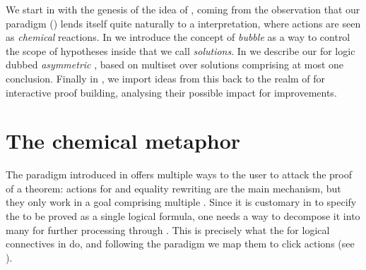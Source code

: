 \begin{scope}
We start in  with the genesis of the idea of , coming from the observation that our  paradigm
() lends itself quite naturally to a 
interpretation, where actions are seen as \emph{chemical} reactions. In
 we introduce the concept of \emph{bubble} as a way to control
the scope of hypotheses inside  that we call
\emph{solutions}. In  we describe our  for
 logic dubbed \emph{asymmetric }, based
on multiset  over solutions comprising at most one
conclusion. Finally in , we import ideas from this
 back to the realm of  for interactive proof
building, analysing their possible impact for  improvements.

\section{The chemical metaphor}

The  paradigm introduced in  offers multiple ways to
the user to attack the proof of a theorem:  actions for 
and equality rewriting are the main mechanism, but they only work in a goal
comprising multiple . Since it is customary in  to specify
the  to be proved as a single logical formula, one needs a way to decompose
it into many  for further processing through . This is precisely what
the  for logical connectives in  do, and
following the  paradigm \cite{PbP} we map them to click
actions (see ).


\end{scope}
